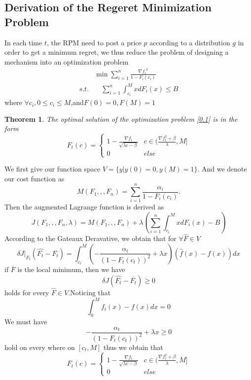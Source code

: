 \documentclass[10pt,conference,compsocconf,letterpaper]{IEEEtran}
\newtheorem{theorem}{Theorem}
\begin{document}
\subsection{Derivation of the Regeret Minimization Problem}

In each time $t$, the RPM need to post a price $p$ according to a distribution $g$ in order to get a minimum regret, we thus reduce the problem of designing a mechanism into an optimization problem
\begin{equation}
\begin{aligned}
&\min \sum_{i=1}^n \frac{{\nabla f_i}^2}{1-F_i(c_i)}\\
s.t. &\quad \sum_{i=1}^n\int_{c_i}^MxdF_i(x)\leq B
\end{aligned}
\end{equation}
where $\forall c_i,0\leq c_i\leq M$,and$F(0)=0,F(M)=1$
\begin{theorem}
The optimal solution of the optimization problem [\ref{}] is in the form 
\begin{equation}
F_t(c)=\begin{cases}
  1-\frac{\nabla f_t}{\sqrt{\lambda c-\beta}} &c\in(\frac{\nabla f_t^2+\beta}{\lambda},M]  \\
  0 & else 
\end{cases}
\end{equation}
\end{theorem}
\begin{IEEEproof}
We first give our function space $V=\{y|y(0)=0,y(M)=1\}$. And we denote our cost function as
\[M(F_1,,,F_n)= \sum_{i=1}^n \frac{\alpha_i}{1-F_i(c_i)}.\]
Then the augmented Lagrange function is derived as
\[J(F_1,,,F_n,\lambda)=M(F_1,,,F_n)+\lambda( \sum_{i=1}^n\int_{c_i}^MxdF_i(x)-B) \]
According to the Gateaux Deravative, we obtain that for $\forall \hat{F}\in V$
\[\delta J|_{F_t}(\hat{F_t}-F_t)=\int_{c_t}^M(-\frac{\alpha_t}{(1-F_t(c_t))^2}+\lambda x)(\hat{f}(x)-f(x))dx\]
if $\overline{F}$ is the local minimum, then we have
\[\delta J(\hat{F_t}-\overline{F_t})\geq 0\]
holds for every $\hat{F}\in V$.Noticing that
\[\int_0^Mf_t(x)-f(x)dx=0\]
We must have 
\[-\frac{\alpha_t}{(1-F_t(c_t))^2}+\lambda x\geq 0\]
hold on every where on $[c_t,M]$
thus we obtain that
\begin{equation}
F_t(c)=\begin{cases}
  1-\frac{\nabla f_t}{\sqrt{\lambda c-\beta}} &c\in(\frac{\nabla f_t^2+\beta}{\lambda},M]  \\
  0 & else 
\end{cases}
\end{equation}
\end{IEEEproof}
\end{document}
